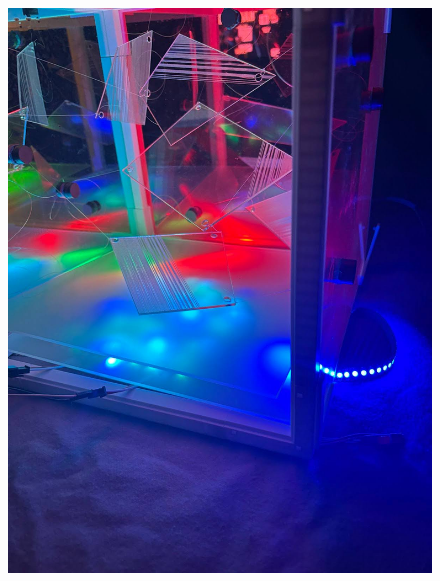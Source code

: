 \documentclass{article}
\begin{document}
\begin{figure}[h]
\begin{minipage}[b]{0.35\textwidth}
    \includegraphics[width=\textwidth]{images/unnamed15.jpg}
  \end{minipage}
\end{figure}

\newpage
\end{document}
